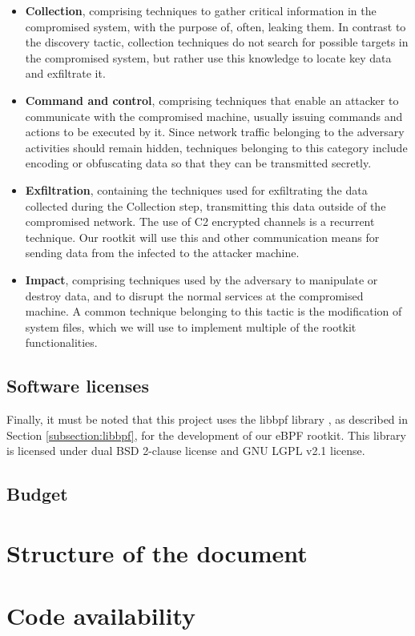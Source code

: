 \begin{itemize}
\item \textbf{Collection}, comprising techniques to gather critical information in the compromised system, with the purpose of, often, leaking them. In contrast to the discovery tactic, collection techniques do not search for possible targets in the compromised system, but rather use this knowledge to locate key data and exfiltrate it.
\item \textbf{Command and control}, comprising techniques that enable an attacker to communicate with the compromised machine, usually issuing commands and actions to be executed by it. Since network traffic belonging to the adversary activities should remain hidden, techniques belonging to this category include encoding or obfuscating data so that they can be transmitted secretly.
\item \textbf{Exfiltration}, containing the techniques used for exfiltrating the data collected during the Collection step, transmitting this data outside of the compromised network. The use of C2 encrypted channels is a recurrent technique. Our rootkit will use this and other communication means for sending data from the infected to the attacker machine.
\item \textbf{Impact}, comprising techniques used by the adversary to manipulate or destroy data, and to disrupt the normal services at the compromised machine. A common technique belonging to this tactic is the modification of system files, which we will use to implement multiple of the rootkit functionalities.
\end{itemize}

\subsection{Software licenses}
Finally, it must be noted that this project uses the libbpf library
\cite{libbpf_github}, as described in Section \ref{subsection:libbpf}, for
the development of our eBPF rootkit. This library is licensed under dual
BSD 2-clause license and GNU LGPL v2.1 license. 

\subsection{Budget}

\section{Structure of the document}

\section{Code availability}


